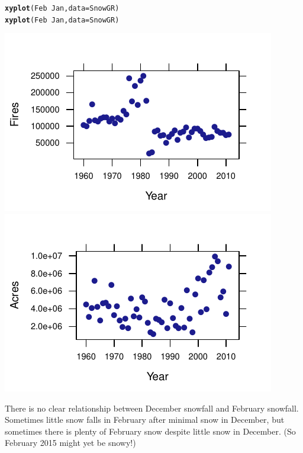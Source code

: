\documentclass[twoside]{book}\usepackage[]{graphicx}\usepackage[]{xcolor}
\makeatletter
\def\maxwidth{ %
  \ifdim\Gin@nat@width>\linewidth
    \linewidth
  \else
    \Gin@nat@width
  \fi
}
\newcommand{\hlopt}[1]{\textcolor[rgb]{0,0,0}{#1}}%
\newcommand{\hlstd}[1]{\textcolor[rgb]{0.345,0.345,0.345}{#1}}%
\newcommand{\hlkwc}[1]{\textcolor[rgb]{0.333,0.667,0.333}{#1}}%
\newcommand{\hlkwd}[1]{\textcolor[rgb]{0.737,0.353,0.396}{\textbf{#1}}}%
\newenvironment{kframe}{%
 \def\at@end@of@kframe{}%
 \ifinner\ifhmode%
  \def\at@end@of@kframe{\end{minipage}}%
  \begin{minipage}{\columnwidth}%
 \fi\fi%
 \def\FrameCommand##1{\hskip\@totalleftmargin \hskip-\fboxsep
 \colorbox{shadecolor}{##1}\hskip-\fboxsep
     \hskip-\linewidth \hskip-\@totalleftmargin \hskip\columnwidth}%
 \MakeFramed {\advance\hsize-\width
   \@totalleftmargin\z@ \linewidth\hsize
   \@setminipage}}%
 {\par\unskip\endMakeFramed%
 \at@end@of@kframe}
\newenvironment{knitrout}{}{} %
\makeatother
\begin{document}
\begin{solution}
\begin{knitrout}
\color{fgcolor}\begin{kframe}
\begin{alltt}
\hlkwd{xyplot}\hlstd{(Feb} \hlopt{~} \hlstd{Jan,} \hlkwc{data} \hlstd{= SnowGR)}
\hlkwd{xyplot}\hlstd{(Feb} \hlopt{~} \hlstd{Jan,} \hlkwc{data} \hlstd{= SnowGR)}
\end{alltt}
\end{kframe}

{\centering \includegraphics[width=\maxwidth]{figures/fig-unnamed-chunk-29-1} 
\includegraphics[width=\maxwidth]{figures/fig-unnamed-chunk-29-2} 

}



\end{knitrout}
There is no clear relationship between December snowfall and February snowfall.  
Sometimes little snow falls in February after minimal snow in December, but sometimes
there is plenty of February snow despite little snow in December.  (So February 2015 might
yet be snowy!)
\end{solution}
\shipoutProblems
\end{document}
